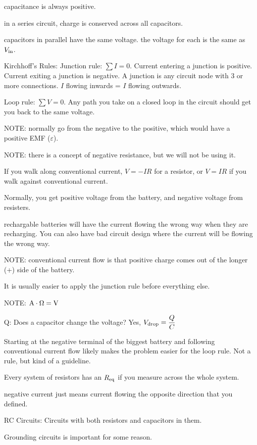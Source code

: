 \documentclass[12pt]{article}
\newcommand \dstyle \displaystyle
\begin{document}
capacitance is always positive.

in a series circuit, charge is conserved across all capacitors.

capacitors in parallel have the same voltage. the voltage for each is the same as $V_{\rm in}$.

Kirchhoff's Rules:
Junction rule: $\dstyle \sum I = 0$.
Current entering a junction is positive.
Current exiting a junction is negative.
A junction is any circuit node with 3 or more connections.
$I$ flowing inwards = $I$ flowing outwards.

Loop rule: $\dstyle \sum V = 0$.
Any path you take on a closed loop in the circuit should get you back to the same voltage.

NOTE: normally go from the negative to the positive, which would have a positive EMF ($\varepsilon$).

NOTE: there is a concept of negative resistance, but we will not be using it.

If you walk along conventional current, $V = -IR$ for a resistor,
or $V = IR$ if you walk against conventional current.

Normally, you get positive voltage from the battery, and negative voltage from resisters.

rechargable batteries will have the current flowing the wrong way when they are recharging.
You can also have bad circuit design where the current will be flowing the wrong way.

NOTE: conventional current flow is that positive charge comes out of the longer (+) side of the battery.

It is usually easier to apply the junction rule before everything else.

NOTE: ${\rm A} \cdot \Omega = {\rm V}$

Q: Does a capacitor change the voltage? Yes, $V_{\rm drop} = \dfrac Q C$

Starting at the negative terminal of the biggest battery and following conventional current flow likely
makes the problem easier for the loop rule. Not a rule, but kind of a guideline.

Every system of resistors has an $R_{\rm eq}$ if you measure across the whole system.

negative current just means current flowing the opposite direction that you defined.

RC Circuits: Circuits with both resistors and capacitors in them.

Grounding circuits is important for some reason.
\end{document}
